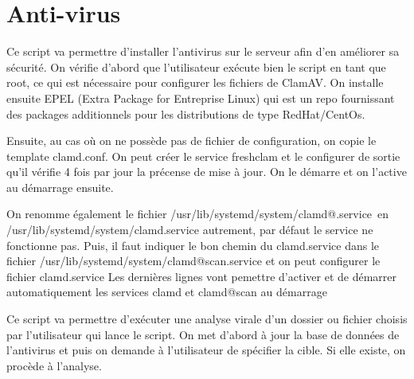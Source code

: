 \section{Anti-virus}

Ce script va permettre d’installer l’antivirus sur le serveur afin d'en améliorer sa sécurité.
On vérifie d’abord que l’utilisateur exécute bien le script en tant que root, ce qui est nécessaire pour configurer les fichiers de ClamAV.
On installe ensuite EPEL (Extra Package for Entreprise Linux) qui est un repo fournissant des packages additionnels pour les distributions de type RedHat/CentOs.

Ensuite, au cas où on ne possède pas de fichier de configuration, on copie le template clamd.conf. On peut créer le service freshclam  et le configurer de sortie qu’il vérifie 4 fois par jour la précense de mise à jour. On le démarre et on l’active au démarrage ensuite.

On renomme également le fichier /usr/lib/systemd/system/clamd@.service en /usr/lib/systemd/system/clamd.service autrement, par défaut le service ne fonctionne pas. Puis, il faut indiquer le bon chemin du clamd.service dans le fichier /usr/lib/systemd/system/clamd@scan.service et on peut configurer le fichier clamd.service
Les dernières lignes vont pemettre d’activer et de démarrer automatiquement les services clamd et clamd@scan au démarrage



Ce script va permettre d’exécuter une analyse virale d’un dossier ou fichier choisis par l’utilisateur qui lance le script.
On met d’abord à jour la base de données de l’antivirus et puis on demande à l’utilisateur de spécifier la cible. Si elle existe, on procède à l’analyse.
